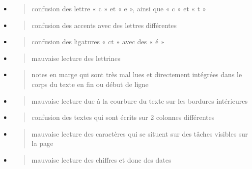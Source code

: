 \documentclass[a4paper,12pt,twoside]{book}
\begin{document}
\begin{itemize}
	\item
	\begin{quote}
		confusion des lettre « c » et « e », ainsi que « c » et « t »
	\end{quote}
	\item
	\begin{quote}
		confusion des accents avec des lettres différentes
	\end{quote}
	\item
	\begin{quote}
		confusion des ligatures « ct » avec des « é »
	\end{quote}
	\item
	\begin{quote}
		mauvaise lecture des lettrines
	\end{quote}
	\item
	\begin{quote}
		notes en marge qui sont très mal lues et directement intégrées dans le
		corps du texte en fin ou début de ligne
	\end{quote}
	\item
	\begin{quote}
		mauvaise lecture due à la courbure du texte sur les bordures
		intérieures
	\end{quote}
	\item
	\begin{quote}
		confusion des textes qui sont écrits sur 2 colonnes différentes
	\end{quote}
	\item
	\begin{quote}
		mauvaise lecture des caractères qui se situent sur des tâches visibles
		sur la page
	\end{quote}
	\item
	\begin{quote}
		mauvaise lecture des chiffres et donc des dates \\
	\end{quote}
\end{itemize}
\end{document}
